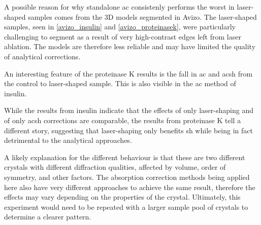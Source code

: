 A possible reason for why standalone \ac{ac} consistenly performs the worst in laser-shaped samples comes from the 3D models segmented in Avizo. The laser-shaped samples, seen in \cref{avizo_insulin} and \cref{avizo_proteinasek}, were particularly challenging to segment as a result of very high-contrast edges left from laser ablation. The models are therefore less reliable and may have limited the quality of analytical corrections.

An interesting feature of the proteinase K results is the fall in \ac{ac} and \ac{acsh} from the control to laser-shaped sample. This is also visible in the \ac{ac} method of insulin. %


While the results from insulin indicate that the effects of only laser-shaping and of only \ac{acsh} corrections are comparable, the results from proteinase K tell a different story, suggesting that laser-shaping only benefits \ac{sh} while being in fact detrimental to the analytical approaches.  %

A likely explanation for the different behaviour is that these are two different crystals with different diffraction qualities, affected by volume, order of symmetry, and other factors. The absorption correction methods being applied here also have very different approaches to achieve the same result, therefore the effects may vary depending on the properties of the crystal. Ultimately, this experiment would need to be repeated with a larger sample pool of crystals to determine a clearer pattern.%


